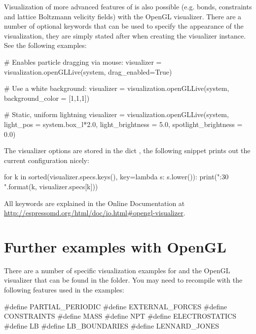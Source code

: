 \documentclass[
paper=a4,                       %
fontsize=11pt,                  %
twoside,                        %
footsepline,                    %
headsepline,                    %
headinclude=false,              %
footinclude=false,              %
pagesize,                       %
]{scrartcl}
\begin{document}
Visualization of more advanced features of \es is also possible (e.g.
bonds, constraints and lattice Boltzmann velicity fields) with the OpenGL
visualizer. There are a number of optional keywords that can be used to specify the
appearance of the visualization, they are simply stated after
 when creating the visualizer instance.
See the following examples:

\begin{pypresso} 
# Enables particle dragging via mouse:
visualizer = visualization.openGLLive(system, drag_enabled=True)
\end{pypresso}

\begin{pypresso} 
# Use a white background:
visualizer = visualization.openGLLive(system, background_color = [1,1,1])
\end{pypresso}

\begin{pypresso} 
# Static, uniform lightning
visualizer = visualization.openGLLive(system, light_pos = system.box_l*2.0, light_brightness = 5.0, spotlight_brightness = 0.0)
\end{pypresso}

The visualizer options are stored in the dict ,
the following snippet prints out the current configuration nicely: 

\begin{pypresso} 
for k in sorted(visualizer.specs.keys(), key=lambda s: s.lower()): print("{:30}  {}".format(k, visualizer.specs[k]))
\end{pypresso}

All keywords are explained in the Online Documentation at
\url{http://espressomd.org/html/doc/io.html#opengl-visualizer}.  

\section{Further examples with OpenGL}

There are a number of specific visualization examples for \es and the OpenGL visualizer that can be found
in the  folder. You may need to recompile \es with the following features used in the examples:

\begin{pypresso}
#define PARTIAL_PERIODIC
#define EXTERNAL_FORCES
#define CONSTRAINTS
#define MASS
#define NPT
#define ELECTROSTATICS
#define LB
#define LB_BOUNDARIES
#define LENNARD_JONES
\end{pypresso}
\end{document}
